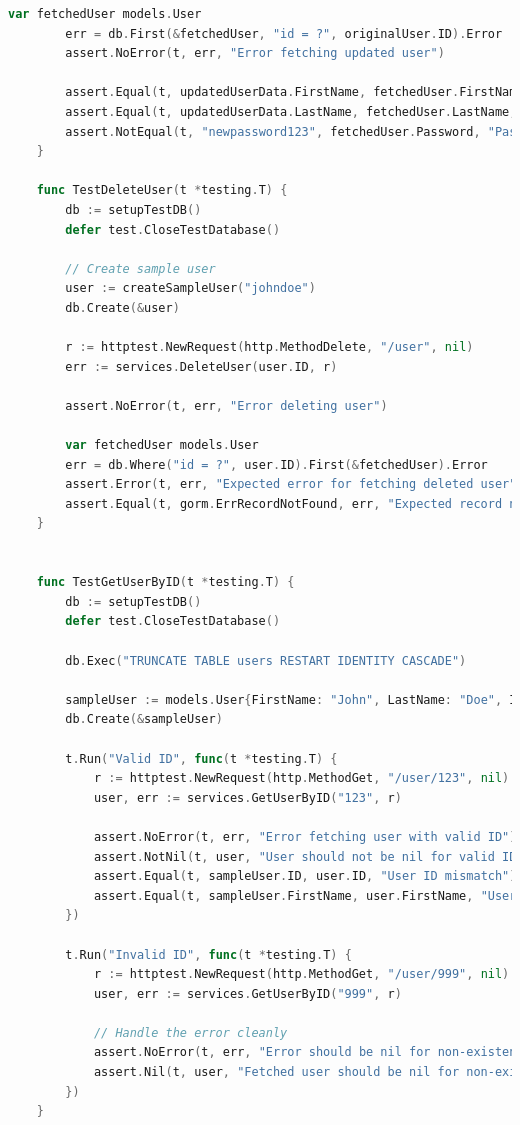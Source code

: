 \begin{lstlisting}[language=Go, frame=single]
		var fetchedUser models.User
		err = db.First(&fetchedUser, "id = ?", originalUser.ID).Error
		assert.NoError(t, err, "Error fetching updated user")
	
		assert.Equal(t, updatedUserData.FirstName, fetchedUser.FirstName, "First name mismatch in database")
		assert.Equal(t, updatedUserData.LastName, fetchedUser.LastName, "Last name mismatch in database")
		assert.NotEqual(t, "newpassword123", fetchedUser.Password, "Password should be hashed in database")
	}
	
	func TestDeleteUser(t *testing.T) {
		db := setupTestDB()
		defer test.CloseTestDatabase()
	
		// Create sample user
		user := createSampleUser("johndoe")
		db.Create(&user)
	
		r := httptest.NewRequest(http.MethodDelete, "/user", nil)
		err := services.DeleteUser(user.ID, r)
	
		assert.NoError(t, err, "Error deleting user")
	
		var fetchedUser models.User
		err = db.Where("id = ?", user.ID).First(&fetchedUser).Error
		assert.Error(t, err, "Expected error for fetching deleted user")
		assert.Equal(t, gorm.ErrRecordNotFound, err, "Expected record not found error for deleted user")
	}
	
	
	func TestGetUserByID(t *testing.T) {
		db := setupTestDB()
		defer test.CloseTestDatabase()
	
		db.Exec("TRUNCATE TABLE users RESTART IDENTITY CASCADE")
	
		sampleUser := models.User{FirstName: "John", LastName: "Doe", ID: "123"}
		db.Create(&sampleUser)
	
		t.Run("Valid ID", func(t *testing.T) {
			r := httptest.NewRequest(http.MethodGet, "/user/123", nil)
			user, err := services.GetUserByID("123", r)
	
			assert.NoError(t, err, "Error fetching user with valid ID")
			assert.NotNil(t, user, "User should not be nil for valid ID")
			assert.Equal(t, sampleUser.ID, user.ID, "User ID mismatch")
			assert.Equal(t, sampleUser.FirstName, user.FirstName, "User first name mismatch")
		})
	
		t.Run("Invalid ID", func(t *testing.T) {
			r := httptest.NewRequest(http.MethodGet, "/user/999", nil)
			user, err := services.GetUserByID("999", r)
	
			// Handle the error cleanly
			assert.NoError(t, err, "Error should be nil for non-existent user ID")
			assert.Nil(t, user, "Fetched user should be nil for non-existent ID")
		})
	}
\end{lstlisting}

